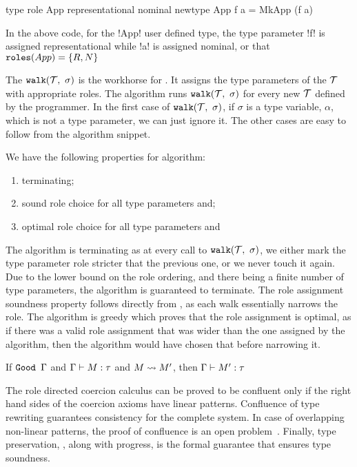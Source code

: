 \documentclass[screen,nonacm,manuscript,review]{acmart} %
\begin{document}
\begin{CenteredBox}
\begin{code}
type role App representational nominal
newtype App f a = MkApp (f a)
\end{code}
\end{CenteredBox}
In the above code, for the !App! user defined type, the type parameter
!f! is assigned representational while !a! is assigned nominal, or
that $\texttt{roles}(App) = \{R, N\}$

The $\texttt{walk}(\mathcal{T},~\sigma)$ is the workhorse for \RoleInfer.
It assigns the type parameters of the $\mathcal{T}$ with appropriate
roles. The algorithm \RoleInfer runs $\texttt{walk}(\mathcal{T},~\sigma)$ for
every new $\mathcal{T}$
defined by the programmer. In the first case of
$\texttt{walk}(\mathcal{T},~\sigma)$, if $\sigma$ is a type variable, $\alpha$,
which is not a type parameter, we can just ignore it. The other cases
are easy to follow from the algorithm snippet.

We have the following properties for \RoleInfer algorithm:
\begin{enumerate}
\item terminating;
\item sound role choice for all type parameters and;
\item optimal role choice for all type parameters and
\end{enumerate}

The algorithm is terminating as at every call to
$\texttt{walk}(\mathcal{T},~\sigma)$, we either mark the type parameter role
stricter that the previous one, or we never touch it again. Due to the
lower bound on the role ordering, and there being a finite number of
type parameters, the algorithm is guaranteed to terminate. The role
assignment soundness property follows directly from
, as each walk essentially narrows the
role. The algorithm is greedy which proves that the role
assignment is optimal, as if there was a valid role assignment that
was wider than the one assigned by the algorithm, then the algorithm
would have chosen that before narrowing it.
\begin{lemma}\label{lem:sfr-preservation}
If $\texttt{Good~}\Gamma$ and $\Gamma \vdash M : \tau$ and $M \rightsquigarrow M'$, then $\Gamma \vdash M' : \tau$
\end{lemma}
The role directed coercion calculus can be proved to be confluent only
if the right hand sides of the coercion axioms have linear
patterns. Confluence of type rewriting guarantees consistency for the
complete system. In case of overlapping non-linear patterns, the proof
of confluence is an open problem~\cite{mizuhito_rta_1995}.
Finally, type preservation, , along
with progress,  is the formal guarantee that
ensures type soundness.
\end{document}
